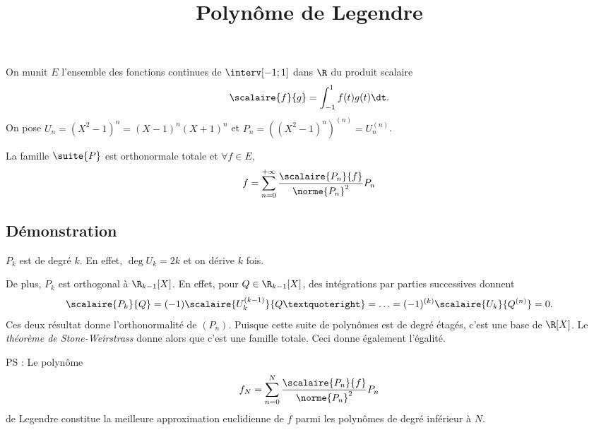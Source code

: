 \documentclass[fontsize=12pt,twoside=false,parskip=half, french]{scrartcl}
\title{Polynôme de Legendre}
\date{}
\author{}
\begin{document}
\maketitle
   On munit $E$ l’ensemble des fonctions continues de $\interv[-1; 1]$ dans $\R$ du produit scalaire
   \[
      \scalaire{f}{g} = \int_{-1}^1 f(t)g(t) \dt.
   \]
   On pose $U_n = (X^2 - 1)^n = (X - 1)^n(X + 1)^n$ et 
   $P_n = ((X^2 - 1)^n)^{(n)} = U_n^{(n)}$.
   \begin{Theoreme}
      La famille $\suite{P}$ est orthonormale totale et $\forall f \in E$,
      \[
         f = \sum_{n = 0}^{+\infty} \frac{\scalaire{P_n}{f}}{\norme{P_n}^2}P_n
      \]
   \end{Theoreme}
   \subsection{Démonstration}
      $P_k$ est de degré $k$. En effet, $\deg U_k = 2k$ et on dérive $k$ fois.

      De plus, $P_k$ est orthogonal à $\R_{k - 1}[X]$. En effet, pour 
      $Q \in \R_{k - 1}[X]$, des intégrations par parties successives donnent
      \[
         \scalaire{P_k}{Q} = (-1)\scalaire{U_k^{(k - 1)}}{Q’} = \ldots = (-1)^{(k)}\scalaire{U_k}{Q^{(n)}} = 0.
      \]
      Ces deux résultat donne l’orthonormalité de $(P_n)$. Puisque cette suite 
      de polynômes est de degré étagés, c’est une base de $\R[X]$. Le 
      \emph{théorème de Stone-Weirstrass} donne alors que c’est une famille totale. 
      Ceci donne également l’égalité.
      
      PS : Le polynôme
         \[
            f_N = \sum_{n = 0}^{N} \frac{\scalaire{P_n}{f}}{\norme{P_n}^2}P_n
         \]de Legendre constitue la meilleure approximation euclidienne
           de $f$ parmi les polynômes de degré inférieur à $N$.       
      
\end{document}
